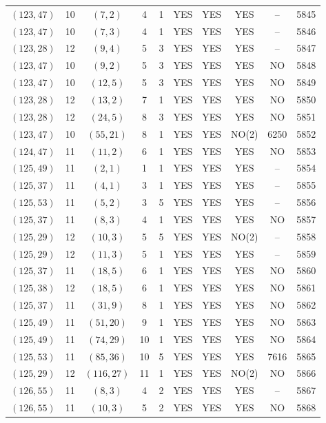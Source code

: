 \begin{longtable}{|c|c|c|c|c|c|c|c|c|c|}
$(123, 47)$ & 10 & $(7, 2)$ & 4 & 1 & YES & YES & YES & -- & 5845\\
$(123, 47)$ & 10 & $(7, 3)$ & 4 & 1 & YES & YES & YES & -- & 5846\\
$(123, 28)$ & 12 & $(9, 4)$ & 5 & 3 & YES & YES & YES & -- & 5847\\
$(123, 47)$ & 10 & $(9, 2)$ & 5 & 3 & YES & YES & YES & NO & 5848\\
$(123, 47)$ & 10 & $(12, 5)$ & 5 & 3 & YES & YES & YES & NO & 5849\\
$(123, 28)$ & 12 & $(13, 2)$ & 7 & 1 & YES & YES & YES & NO & 5850\\
$(123, 28)$ & 12 & $(24, 5)$ & 8 & 3 & YES & YES & YES & NO & 5851\\
$(123, 47)$ & 10 & $(55, 21)$ & 8 & 1 & YES & YES & NO(2) & 6250 & 5852\\
$(124, 47)$ & 11 & $(11, 2)$ & 6 & 1 & YES & YES & YES & NO & 5853\\
$(125, 49)$ & 11 & $(2, 1)$ & 1 & 1 & YES & YES & YES & -- & 5854\\
$(125, 37)$ & 11 & $(4, 1)$ & 3 & 1 & YES & YES & YES & -- & 5855\\
$(125, 53)$ & 11 & $(5, 2)$ & 3 & 5 & YES & YES & YES & -- & 5856\\
$(125, 37)$ & 11 & $(8, 3)$ & 4 & 1 & YES & YES & YES & NO & 5857\\
$(125, 29)$ & 12 & $(10, 3)$ & 5 & 5 & YES & YES & NO(2) & -- & 5858\\
$(125, 29)$ & 12 & $(11, 3)$ & 5 & 1 & YES & YES & YES & -- & 5859\\
$(125, 37)$ & 11 & $(18, 5)$ & 6 & 1 & YES & YES & YES & NO & 5860\\
$(125, 38)$ & 12 & $(18, 5)$ & 6 & 1 & YES & YES & YES & NO & 5861\\
$(125, 37)$ & 11 & $(31, 9)$ & 8 & 1 & YES & YES & YES & NO & 5862\\
$(125, 49)$ & 11 & $(51, 20)$ & 9 & 1 & YES & YES & YES & NO & 5863\\
$(125, 49)$ & 11 & $(74, 29)$ & 10 & 1 & YES & YES & YES & NO & 5864\\
$(125, 53)$ & 11 & $(85, 36)$ & 10 & 5 & YES & YES & YES & 7616 & 5865\\
$(125, 29)$ & 12 & $(116, 27)$ & 11 & 1 & YES & YES & NO(2) & NO & 5866\\
$(126, 55)$ & 11 & $(8, 3)$ & 4 & 2 & YES & YES & YES & -- & 5867\\
$(126, 55)$ & 11 & $(10, 3)$ & 5 & 2 & YES & YES & YES & NO & 5868\\

\end{longtable}
